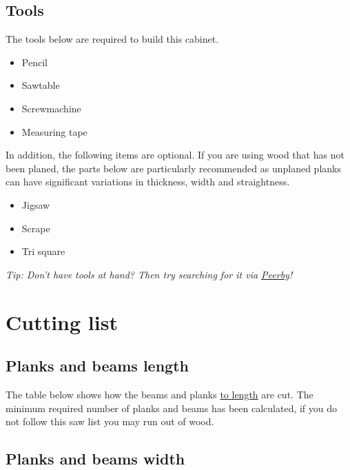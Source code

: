 \documentclass{article}
\begin{document}
\subsection{Tools}

The tools below are required to build this cabinet.

\begin{itemize}
    \item Pencil
    \item Sawtable
    \item Screwmachine
    \item Measuring tape
\end{itemize}

In addition, the following items are optional. If you are using wood that has not been planed, the parts below are particularly recommended as unplaned planks can have significant variations in thickness, width and straightness.

\begin{itemize}
    \item Jigsaw
    \item Scrape
    \item Tri square
\end{itemize}

\begin{center}
    \textit{Tip: Don't have tools at hand? Then try searching for it via \href{https://www.peerby.com/}{Peerby}!}
\end{center}

\clearpage
\newpage

\section{Cutting list}

\subsection{Planks and beams length}

The table below shows how the beams and planks \underline{to length} are cut. The minimum required number of planks and beams has been calculated, if you do not follow this saw list you may run out of wood.





\subsection{Planks and beams width}
\end{document}
